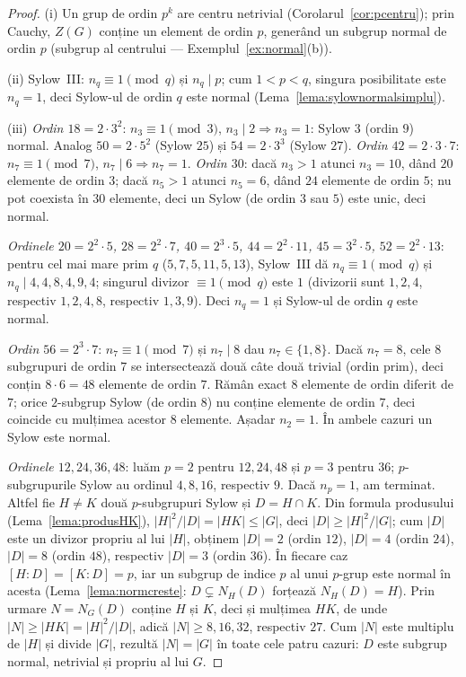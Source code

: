 \begin{proof}
(i) Un grup de ordin $p^k$ are centru netrivial (Corolarul~\ref{cor:pcentru}); prin Cauchy, $Z(G)$ conține un element de ordin $p$, generând un subgrup normal de ordin $p$ (subgrup al centrului --- Exemplul~\ref{ex:normal}(b)).

(ii) Sylow~III: $n_q\equiv1\pmod q$ și $n_q\mid p$; cum $1<p<q$, singura posibilitate este $n_q=1$, deci Sylow-ul de ordin $q$ este normal (Lema~\ref{lema:sylownormalsimplu}).

(iii) \emph{Ordin $18=2\cdot3^2$}: $n_3\equiv1\pmod3$, $n_3\mid2\Rightarrow n_3=1$: Sylow $3$ (ordin $9$) normal. Analog $50=2\cdot5^2$ (Sylow $25$) și $54=2\cdot3^3$ (Sylow $27$). \emph{Ordin $42=2\cdot3\cdot7$}: $n_7\equiv1\pmod7$, $n_7\mid6\Rightarrow n_7=1$. \emph{Ordin $30$}: dacă $n_3>1$ atunci $n_3=10$, dând $20$ elemente de ordin $3$; dacă $n_5>1$ atunci $n_5=6$, dând $24$ elemente de ordin $5$; nu pot coexista în $30$ elemente, deci un Sylow (de ordin $3$ sau $5$) este unic, deci normal.

\emph{Ordinele $20=2^2\cdot5$, $28=2^2\cdot7$, $40=2^3\cdot5$, $44=2^2\cdot11$, $45=3^2\cdot5$, $52=2^2\cdot13$}: pentru cel mai mare prim $q$ ($5,7,5,11,5,13$), Sylow~III dă $n_q\equiv1\pmod q$ și $n_q\mid4,4,8,4,9,4$; singurul divizor $\equiv1\pmod q$ este $1$ (divizorii sunt $1,2,4$, respectiv $1,2,4,8$, respectiv $1,3,9$). Deci $n_q=1$ și Sylow-ul de ordin $q$ este normal.

\emph{Ordin $56=2^3\cdot7$}: $n_7\equiv1\pmod7$ și $n_7\mid8$ dau $n_7\in\{1,8\}$. Dacă $n_7=8$, cele $8$ subgrupuri de ordin $7$ se intersectează două câte două trivial (ordin prim), deci conțin $8\cdot6=48$ elemente de ordin $7$. Rămân exact $8$ elemente de ordin diferit de $7$; orice $2$-subgrup Sylow (de ordin $8$) nu conține elemente de ordin $7$, deci coincide cu mulțimea acestor $8$ elemente. Așadar $n_2=1$. În ambele cazuri un Sylow este normal.

\emph{Ordinele $12,24,36,48$}: luăm $p=2$ pentru $12,24,48$ și $p=3$ pentru $36$; $p$-subgrupurile Sylow au ordinul $4,8,16$, respectiv $9$. Dacă $n_p=1$, am terminat. Altfel fie $H\neq K$ două $p$-subgrupuri Sylow și $D=H\cap K$. Din formula produsului (Lema~\ref{lema:produsHK}), $|H|^2/|D|=|HK|\le|G|$, deci $|D|\ge|H|^2/|G|$; cum $|D|$ este un divizor propriu al lui $|H|$, obținem $|D|=2$ (ordin $12$), $|D|=4$ (ordin $24$), $|D|=8$ (ordin $48$), respectiv $|D|=3$ (ordin $36$). În fiecare caz $[H:D]=[K:D]=p$, iar un subgrup de indice $p$ al unui $p$-grup este normal în acesta (Lema~\ref{lema:normcreste}: $D\subsetneq N_H(D)$ forțează $N_H(D)=H$). Prin urmare $N=N_G(D)$ conține $H$ și $K$, deci și mulțimea $HK$, de unde $|N|\ge|HK|=|H|^2/|D|$, adică $|N|\ge8,16,32$, respectiv $27$. Cum $|N|$ este multiplu de $|H|$ și divide $|G|$, rezultă $|N|=|G|$ în toate cele patru cazuri: $D$ este subgrup normal, netrivial și propriu al lui $G$.
\end{proof}

